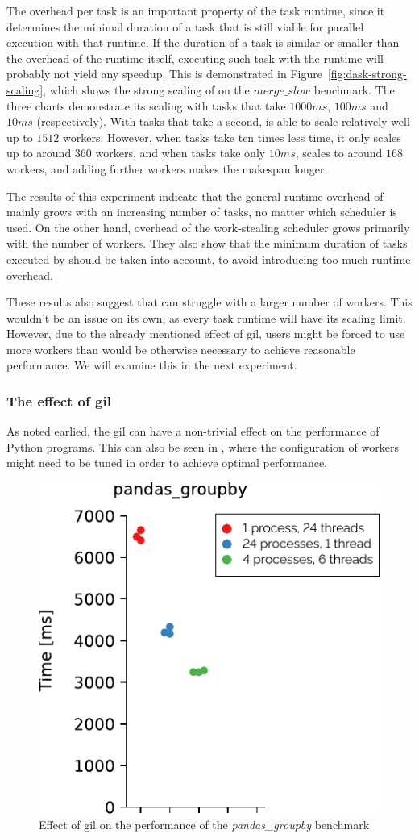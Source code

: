 The overhead per task is an important property of the task runtime, since it determines the minimal
duration of a task that is still viable for parallel execution with that runtime. If the duration
of a task is similar or smaller than the overhead of the runtime itself, executing such task with
the runtime will probably not yield any speedup. This is demonstrated in
Figure~\ref{fig:dask-strong-scaling}, which shows the strong scaling of \dask{}
on the $merge\_slow$ benchmark. The three charts demonstrate its scaling with tasks
that take $1000ms$, $100ms$ and $10ms$
(respectively). With tasks that take a second, \dask{} is able to scale
relatively well up to $1512$ workers. However, when tasks take ten times less
time, it only scales up to around $360$ workers, and when tasks take only
$10ms$, \dask{} scales to around $168$
workers, and adding further workers makes the makespan longer.

The results of this experiment indicate that the general runtime overhead of
\dask{} mainly grows with an increasing number of tasks, no matter which
scheduler is used. On the other hand, overhead of the work-stealing scheduler grows primarily with
the number of workers. They also show that the minimum duration of tasks executed by
\dask{} should be taken into account, to avoid introducing too much runtime
overhead.

These results also suggest that \dask{} can struggle with a larger number of
workers. This wouldn't be an issue on its own, as every task runtime will have its scaling limit.
However, due to the already mentioned effect of \gls{gil},
\dask{} users might be forced to use more workers than would be otherwise
necessary to achieve reasonable performance. We will examine this in the next experiment.

\subsubsection*{The effect of \gls{gil}}
As noted earlied, the \gls{gil} can have a non-trivial effect on the performance
of Python programs. This can also be seen in \dask{}, where the configuration
of workers might need to be tuned in order to achieve optimal performance.

\begin{figure}
	\centering
	\includegraphics[width=0.3\linewidth]{./imgs/rsds/charts/dask-gil-scaling}
	\caption{Effect of \gls{gil} on the performance of the \emph{pandas\_groupby} benchmark}
	\label{fig:dask-gil-scaling}
\end{figure}

